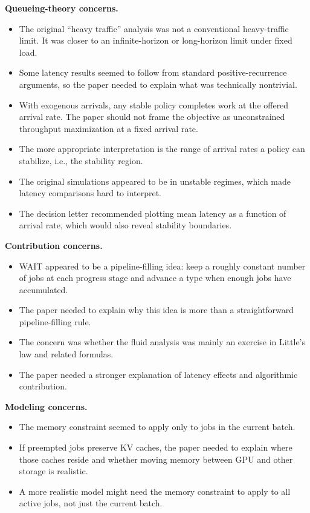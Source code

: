 \documentclass[11pt]{article}
\begin{document}
\textbf{Queueing-theory concerns.}
\begin{itemize}
    \item The original ``heavy traffic'' analysis was not a conventional heavy-traffic limit. It was closer to an infinite-horizon or long-horizon limit under fixed load.
    \item Some latency results seemed to follow from standard positive-recurrence arguments, so the paper needed to explain what was technically nontrivial.
    \item With exogenous arrivals, any stable policy completes work at the offered arrival rate. The paper should not frame the objective as unconstrained throughput maximization at a fixed arrival rate.
    \item The more appropriate interpretation is the range of arrival rates a policy can stabilize, i.e., the stability region.
    \item The original simulations appeared to be in unstable regimes, which made latency comparisons hard to interpret.
    \item The decision letter recommended plotting mean latency as a function of arrival rate, which would also reveal stability boundaries.
\end{itemize}

\textbf{Contribution concerns.}
\begin{itemize}
    \item WAIT appeared to be a pipeline-filling idea: keep a roughly constant number of jobs at each progress stage and advance a type when enough jobs have accumulated.
    \item The paper needed to explain why this idea is more than a straightforward pipeline-filling rule.
    \item The concern was whether the fluid analysis was mainly an exercise in Little's law and related formulas.
    \item The paper needed a stronger explanation of latency effects and algorithmic contribution.
\end{itemize}

\textbf{Modeling concerns.}
\begin{itemize}
    \item The memory constraint seemed to apply only to jobs in the current batch.
    \item If preempted jobs preserve KV caches, the paper needed to explain where those caches reside and whether moving memory between GPU and other storage is realistic.
    \item A more realistic model might need the memory constraint to apply to all active jobs, not just the current batch.
\end{itemize}
\end{document}
